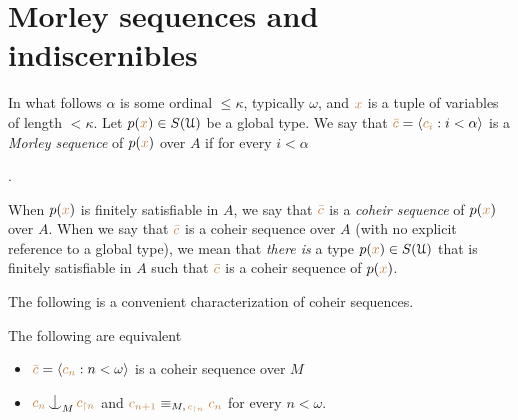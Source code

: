 \section{Morley sequences and indiscernibles}

In what follows $\alpha$ is some ordinal $\le\kappa$, typically $\omega$, and ${\color{brown} x}$ is a tuple of variables of length $<\kappa$.
Let \mbox{$p({\color{brown} x})\in S(\EuScript U)$} be a global type.
We say that ${\color{brown}\bar c}=\langle{\color{brown}c_i}:i<\alpha\rangle$ is a \emph{Morley sequence\/} of $p({\color{brown} x})$ over $A$ if for every $i<\alpha$

.

When $p({\color{brown} x})$ is finitely satisfiable in $A$, we say that ${\color{brown}\bar c}$ is a \emph{coheir sequence\/} of $p({\color{brown} x})$ over $A$.
When we say that ${\color{brown}\bar c}$ is a coheir sequence over $A$ (with no explicit reference to a global type), we mean that \textit{there is\/} a type $p({\color{brown} x})\in S(\EuScript U)$ that is finitely satisfiable in $A$ such that ${\color{brown}\bar c}$ is a coheir sequence of $p({\color{brown} x})$.

The following is a convenient characterization of coheir sequences.

\begin{lemma}\label{lem_coheir_property}
The following are equivalent
\begin{itemize}
\item[1.] ${\color{brown}\bar c}=\langle{\color{brown}c_n}:n<\omega\rangle$ is a coheir sequence over $M$
\item[2.] ${\mr c_n}\nonfork_M{\mr c_{\restriction n}}$ and ${\color{brown} c_{n+1}}\equiv_{M,\,{\color{brown} c_{\restriction n}}}{\color{brown} c_n}$ for every $n<\omega$.
\end{itemize}
\end{lemma}

